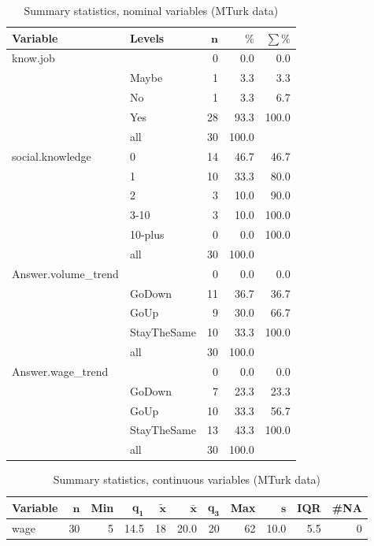 \documentclass[a4paper,10pt]{article}\usepackage[]{graphicx}\usepackage[]{color}
\begin{document}
\begin{table}[ht]
\centering
{\footnotesize
\begin{tabular}{ll|rrr}
 \textbf{Variable} & \textbf{Levels} & $\mathbf{n}$ & $\mathbf{\%}$ & $\mathbf{\sum \%}$ \\ 
  \hline
know.job &  & 0 & 0.0 & 0.0 \\ 
   & Maybe & 1 & 3.3 & 3.3 \\ 
   & No & 1 & 3.3 & 6.7 \\ 
   & Yes & 28 & 93.3 & 100.0 \\ 
   \hline
 & all & 30 & 100.0 &  \\ 
   \hline
\hline
social.knowledge & 0 & 14 & 46.7 & 46.7 \\ 
   & 1 & 10 & 33.3 & 80.0 \\ 
   & 2 & 3 & 10.0 & 90.0 \\ 
   & 3-10 & 3 & 10.0 & 100.0 \\ 
   & 10-plus & 0 & 0.0 & 100.0 \\ 
   \hline
 & all & 30 & 100.0 &  \\ 
   \hline
\hline
Answer.volume\_trend &  & 0 & 0.0 & 0.0 \\ 
   & GoDown & 11 & 36.7 & 36.7 \\ 
   & GoUp & 9 & 30.0 & 66.7 \\ 
   & StayTheSame & 10 & 33.3 & 100.0 \\ 
   \hline
 & all & 30 & 100.0 &  \\ 
   \hline
\hline
Answer.wage\_trend &  & 0 & 0.0 & 0.0 \\ 
   & GoDown & 7 & 23.3 & 23.3 \\ 
   & GoUp & 10 & 33.3 & 56.7 \\ 
   & StayTheSame & 13 & 43.3 & 100.0 \\ 
   \hline
 & all & 30 & 100.0 &  \\ 
   \hline
\hline
\end{tabular}
}
\caption{Summary statistics, nominal variables (MTurk data)} 
\label{tab1:41-3020}
\end{table}
\begin{table}[ht]
\centering
{\footnotesize
\begin{tabular}{lrrrrrrrrrr}
 \textbf{Variable} & $\mathbf{n}$ & \textbf{Min} & $\mathbf{q_1}$ & $\mathbf{\widetilde{x}}$ & $\mathbf{\bar{x}}$ & $\mathbf{q_3}$ & \textbf{Max} & $\mathbf{s}$ & \textbf{IQR} & \textbf{\#NA} \\ 
  \hline
wage & 30 & 5 & 14.5 & 18 & 20.0 & 20 & 62 & 10.0 & 5.5 & 0 \\ 
  \end{tabular}
}
\caption{Summary statistics, continuous variables (MTurk data)} 
\label{tab2:41-3020}
\end{table}
\end{document}
